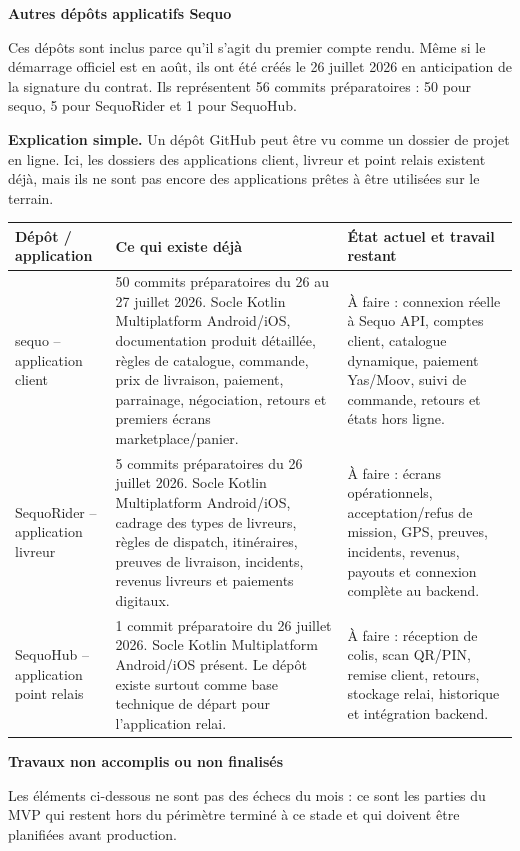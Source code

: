 \documentclass[11pt,letterpaper]{article}
\newcommand{\sectiontitle}[1]{%
  \vspace{0.55em}
  {\Large\bfseries\color{SequoInk}#1}\par
  \vspace{0.1em}
}
\newcommand{\simpleexplanation}[1]{%
  {\small\textbf{\color{SequoBlue}Explication simple.} \color{SequoMuted}#1\par}
}
\begin{document}
\sectiontitle{Autres dépôts applicatifs Sequo}
Ces dépôts sont inclus parce qu'il s'agit du premier compte rendu. Même si le démarrage officiel est en août, ils ont été créés le 26 juillet 2026 en anticipation de la signature du contrat. Ils représentent 56 commits préparatoires : 50 pour sequo, 5 pour SequoRider et 1 pour SequoHub.

\simpleexplanation{Un dépôt GitHub peut être vu comme un dossier de projet en ligne. Ici, les dossiers des applications client, livreur et point relais existent déjà, mais ils ne sont pas encore des applications prêtes à être utilisées sur le terrain.}

{\footnotesize
\begin{tabularx}{\linewidth}{@{}L{3.3cm}Y Y@{}}
\toprule
{}
\textbf{Dépôt / application} & \textbf{Ce qui existe déjà} & \textbf{État actuel et travail restant} \\
\midrule
sequo -- application client & 50 commits préparatoires du 26 au 27 juillet 2026. Socle Kotlin Multiplatform Android/iOS, documentation produit détaillée, règles de catalogue, commande, prix de livraison, paiement, parrainage, négociation, retours et premiers écrans marketplace/panier. & À faire : connexion réelle à Sequo API, comptes client, catalogue dynamique, paiement Yas/Moov, suivi de commande, retours et états hors ligne. \\
SequoRider -- application livreur & 5 commits préparatoires du 26 juillet 2026. Socle Kotlin Multiplatform Android/iOS, cadrage des types de livreurs, règles de dispatch, itinéraires, preuves de livraison, incidents, revenus livreurs et paiements digitaux. & À faire : écrans opérationnels, acceptation/refus de mission, GPS, preuves, incidents, revenus, payouts et connexion complète au backend. \\
SequoHub -- application point relais & 1 commit préparatoire du 26 juillet 2026. Socle Kotlin Multiplatform Android/iOS présent. Le dépôt existe surtout comme base technique de départ pour l'application relai. & À faire : réception de colis, scan QR/PIN, remise client, retours, stockage relai, historique et intégration backend. \\
\bottomrule
\end{tabularx}
}

\sectiontitle{Travaux non accomplis ou non finalisés}
Les éléments ci-dessous ne sont pas des échecs du mois : ce sont les parties du MVP qui restent hors du périmètre terminé à ce stade et qui doivent être planifiées avant production.
\end{document}
